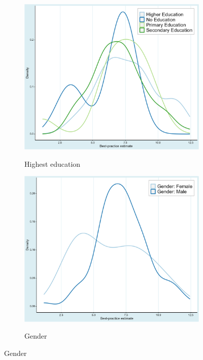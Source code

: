 \begin{figure}[!htbp]
\begin{center}
\begin{subfigure}[!htbp]{0.38\textwidth}
   \vspace{0.2cm}
   \caption{Highest education}
   \vspace{-0.1cm}
   \includegraphics[width=0.95\linewidth]{Figures/BPE/bpe_education.png}
   \label{fig:bpe_education}
\end{subfigure}
\begin{subfigure}[!htbp]{0.38\textwidth}
   \vspace{0.2cm}
   \caption{Gender}
   \vspace{-0.1cm}
   \includegraphics[width=0.95\linewidth]{Figures/BPE/bpe_gender.png}
   \label{fig:bpe_gender}
\end{subfigure}


\end{center}
\end{figure}
